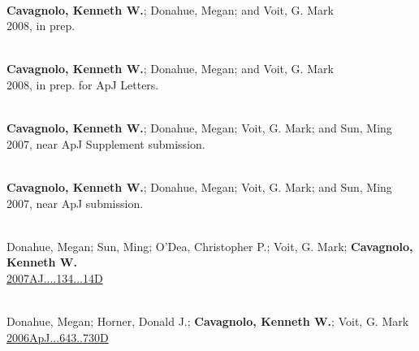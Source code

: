 \documentclass[11pt]{cv}
\begin{document}
\begin{llist}


{}\\
{\bf Cavagnolo, Kenneth W.}; Donahue, Megan; and Voit, G. Mark\\
2008, in prep.

{}\\
{\bf Cavagnolo, Kenneth W.}; Donahue, Megan; and Voit, G. Mark\\
2008, in prep. for ApJ Letters.

{}\\
{\bf Cavagnolo, Kenneth W.}; Donahue, Megan; Voit, G. Mark; and Sun, Ming\\
2007, near ApJ Supplement submission.

{}\\
{\bf Cavagnolo, Kenneth W.}; Donahue, Megan; Voit, G. Mark; and Sun, Ming\\
2007, near ApJ submission.



{}\\
Donahue, Megan; Sun, Ming; O'Dea, Christopher P.; Voit, G. Mark; {\bf Cavagnolo, Kenneth W.}\\
\href{http://adsabs.harvard.edu/abs/2007AJ....134...14D}{2007AJ....134...14D}

{}\\
Donahue, Megan; Horner, Donald J.; {\bf Cavagnolo, Kenneth W.}; Voit, G. Mark\\
\href{http://adsabs.harvard.edu/abs/2006ApJ...643..730D}{2006ApJ...643..730D}


\end{llist}
\end{document}
